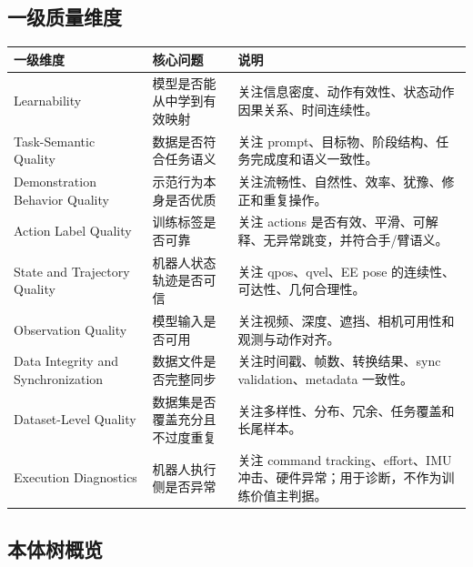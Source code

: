 \documentclass[UTF8,zihao=-4]{ctexart}
\begin{document}
\subsection{一级质量维度}

\begin{longtable}{L{3.2cm} L{4.2cm} L{6.2cm}}
\toprule
一级维度 & 核心问题 & 说明 \\
\midrule
Learnability & 模型是否能从中学到有效映射 & 关注信息密度、动作有效性、状态动作因果关系、时间连续性。 \\
Task-Semantic Quality & 数据是否符合任务语义 & 关注 prompt、目标物、阶段结构、任务完成度和语义一致性。 \\
Demonstration Behavior Quality & 示范行为本身是否优质 & 关注流畅性、自然性、效率、犹豫、修正和重复操作。 \\
Action Label Quality & 训练标签是否可靠 & 关注 actions 是否有效、平滑、可解释、无异常跳变，并符合手/臂语义。 \\
State and Trajectory Quality & 机器人状态轨迹是否可信 & 关注 qpos、qvel、EE pose 的连续性、可达性、几何合理性。 \\
Observation Quality & 模型输入是否可用 & 关注视频、深度、遮挡、相机可用性和观测与动作对齐。 \\
Data Integrity and Synchronization & 数据文件是否完整同步 & 关注时间戳、帧数、转换结果、sync validation、metadata 一致性。 \\
Dataset-Level Quality & 数据集是否覆盖充分且不过度重复 & 关注多样性、分布、冗余、任务覆盖和长尾样本。 \\
Execution Diagnostics & 机器人执行侧是否异常 & 关注 command tracking、effort、IMU 冲击、硬件异常；用于诊断，不作为训练价值主判据。 \\
\bottomrule
\end{longtable}

\subsection{本体树概览}
\end{document}
